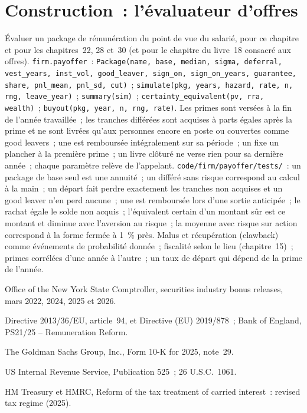 \section{Construction~: l'évaluateur d'offres}\label{bld:in:how-pay-works:payoffer}

\begin{build}
 Évaluer un package de rémunération du point de vue du salarié, pour ce chapitre et pour les chapitres~22, 28 et~30 (et pour
le chapitre du livre~18 consacré aux offres).
 \texttt{firm.payoffer}~:
\texttt{Package(name, base, median, sigma, deferral, vest\_years, inst\_vol, good\_leaver, sign\_on, sign\_on\_years, guarantee, share, pnl\_mean, pnl\_sd, cut)}~;
\texttt{simulate(pkg, years, hazard, rate, n, rng, leave\_year)}~; \texttt{summary(sim)}~;
\texttt{certainty\_equivalent(pv, rra, wealth)}~; \texttt{buyout(pkg, year, n, rng, rate)}.
 Les primes sont versées à la fin de l'année travaillée~; les tranches différées sont acquises à parts égales après la prime et
ne sont livrées qu'aux personnes encore en poste ou couvertes comme good leavers~; une  est remboursée intégralement sur sa période~;
un  fixe un plancher à la première prime~; un livre clôturé ne verse rien pour sa dernière année~; chaque paramètre relève de l'appelant.
 \texttt{code/firm/payoffer/tests/}~: un package de base seul est une annuité~; un différé sans risque
correspond au calcul à la main~; un départ fait perdre exactement les tranches non acquises et un good leaver n'en perd aucune~; une  est remboursée lors
d'une sortie anticipée~; le rachat égale le solde non acquis~; l'équivalent certain d'un montant sûr est ce montant et diminue
avec l'aversion au risque~; la moyenne avec risque sur action correspond à la forme fermée à 1~\% près.
 Malus et récupération (clawback) comme événements de probabilité donnée~; fiscalité selon le lieu (chapitre~15)~; primes corrélées
d'une année à l'autre~; un taux de départ qui dépend de la prime de l'année.
\end{build}

\begin{omsources}
\item Office of the New York State Comptroller, securities industry bonus releases, mars 2022, 2024, 2025 et 2026.
\item Directive 2013/36/EU, article~94, et Directive (EU) 2019/878~; Bank of England, PS21/25 -- Remuneration Reform.
\item The Goldman Sachs Group, Inc., Form 10-K for 2025, note~29.
\item US Internal Revenue Service, Publication 525~; 26 U.S.C.\ 1061.
\item HM Treasury et HMRC, Reform of the tax treatment of carried interest~: revised tax regime (2025).
\end{omsources}

